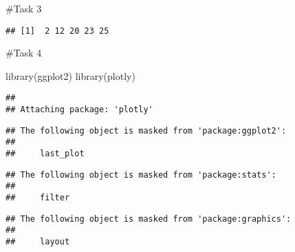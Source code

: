 \documentclass[
]{article}
\newenvironment{Shaded}{\begin{snugshade}}{\end{snugshade}}
\newcommand{\DecValTok}[1]{\textcolor[rgb]{0.00,0.00,0.81}{#1}}
\newcommand{\FunctionTok}[1]{\textcolor[rgb]{0.00,0.00,0.00}{#1}}
\newcommand{\NormalTok}[1]{#1}
\newcommand{\OtherTok}[1]{\textcolor[rgb]{0.56,0.35,0.01}{#1}}
\newcommand{\SpecialCharTok}[1]{\textcolor[rgb]{0.00,0.00,0.00}{#1}}
\newcommand{\StringTok}[1]{\textcolor[rgb]{0.31,0.60,0.02}{#1}}
\begin{document}
\#Task 3

\begin{Shaded}
\end{Shaded}

\begin{verbatim}
## [1]  2 12 20 23 25
\end{verbatim}

\#Task 4

\begin{Shaded}
\begin{Highlighting}[]
\FunctionTok{library}\NormalTok{(ggplot2)}
\FunctionTok{library}\NormalTok{(plotly)}
\end{Highlighting}
\end{Shaded}

\begin{verbatim}
## 
## Attaching package: 'plotly'
\end{verbatim}

\begin{verbatim}
## The following object is masked from 'package:ggplot2':
## 
##     last_plot
\end{verbatim}

\begin{verbatim}
## The following object is masked from 'package:stats':
## 
##     filter
\end{verbatim}

\begin{verbatim}
## The following object is masked from 'package:graphics':
## 
##     layout
\end{verbatim}
\end{document}
